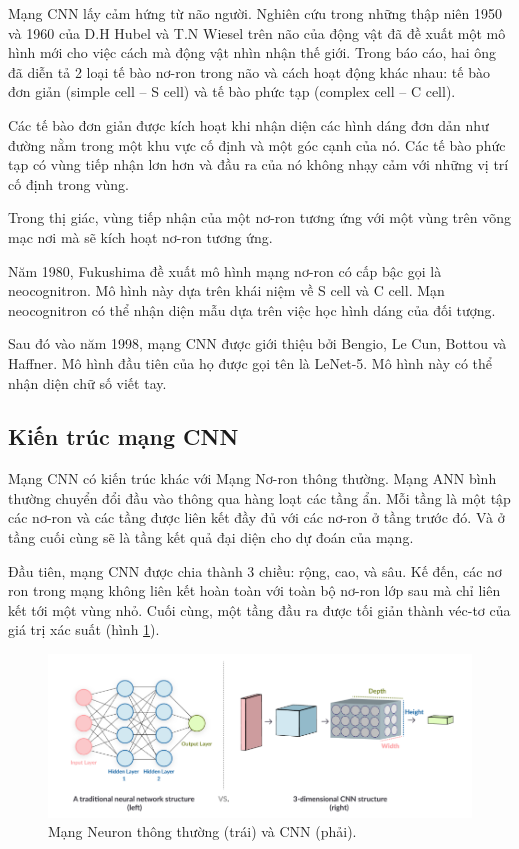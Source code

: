 Mạng CNN lấy cảm hứng từ não người. Nghiên cứu trong những thập niên 1950 và 1960 của D.H Hubel và T.N Wiesel trên não của động vật đã đề xuất một mô hình mới cho việc cách mà động vật nhìn nhận thế giới. Trong báo cáo, hai ông đã diễn tả 2 loại tế bào nơ-ron trong não và cách hoạt động khác nhau: tế bào đơn giản (simple cell – S cell) và tế bào phức tạp (complex cell – C cell). 

Các tế bào đơn giản được kích hoạt khi nhận diện các hình dáng đơn dản như đường nằm trong một khu vực cố định và một góc cạnh của nó. Các tế bào phức tạp có vùng tiếp nhận lơn hơn và đầu ra của nó không nhạy cảm với những vị trí cố định trong vùng. 

Trong thị giác, vùng tiếp nhận của một nơ-ron tương ứng với một vùng trên võng mạc nơi mà sẽ kích hoạt nơ-ron tương ứng. 

Năm 1980, Fukushima đề xuất mô hình mạng nơ-ron có cấp bậc gọi là neocognitron. Mô hình này dựa trên khái niệm về S cell và C cell. Mạn neocognitron có thể nhận diện mẫu dựa trên việc học hình dáng của đối tượng. 

Sau đó vào năm 1998, mạng CNN được giới thiệu bởi Bengio, Le Cun, Bottou và Haffner. Mô hình đầu tiên của họ được gọi tên là LeNet-5. Mô hình này có thể nhận diện chữ số viết tay.

\subsection{Kiến trúc mạng CNN}
Mạng CNN có kiến trúc khác với Mạng Nơ-ron thông thường. Mạng ANN bình thường chuyển đổi đầu vào thông qua hàng loạt các tầng ẩn. Mỗi tầng là một tập các nơ-ron và các tầng được liên kết đầy đủ với các nơ-ron ở tầng trước đó. Và ở tầng cuối cùng sẽ là tầng kết quả đại diện cho dự đoán của mạng.

Đầu tiên, mạng CNN được chia thành 3 chiều: rộng, cao, và sâu. Kế đến, các nơ ron trong mạng không liên kết hoàn toàn với toàn bộ nơ-ron lớp sau mà chỉ liên kết tới một vùng nhỏ. Cuối cùng, một tầng đầu ra được tối giản thành véc-tơ của giá trị xác suất (hình \ref{fig:neuronnetwork}).

\begin{figure}[H]
	\centering
	\includegraphics[width=1\linewidth]{images/neuronnetwork}
	\caption{Mạng Neuron thông thường (trái) và CNN (phải).}
	\label{fig:neuronnetwork}
\end{figure}

